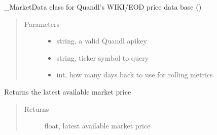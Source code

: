 \documentclass[letterpaper,10pt,english]{sphinxmanual}
\begin{document}
\begin{fulllineitems}
\label{\detokenize{market_data:risk_dash.market_data.QuandlStockData}}
\sphinxAtStartPar
\_MarketData class for Quandl’s WIKI/EOD price data base ()
\begin{quote}\begin{description}
\item[{Parameters}] \leavevmode\begin{itemize}
\item {} 
\sphinxAtStartPar
{} \textendash{} string, a valid Quandl apikey

\item {} 
\sphinxAtStartPar
{} \textendash{} string, ticker symbol to query

\item {} 
\sphinxAtStartPar
{} \textendash{} int, how many days back to use for rolling metrics

\end{itemize}

\end{description}\end{quote}

\begin{fulllineitems}
\label{\detokenize{market_data:risk_dash.market_data.QuandlStockData.current_price}}
\sphinxAtStartPar
Returns the latest available market price
\begin{quote}\begin{description}
\item[{Returns}] \leavevmode
\sphinxAtStartPar
float, latest available market price

\end{description}\end{quote}

\end{fulllineitems}


\end{fulllineitems}
\end{document}
